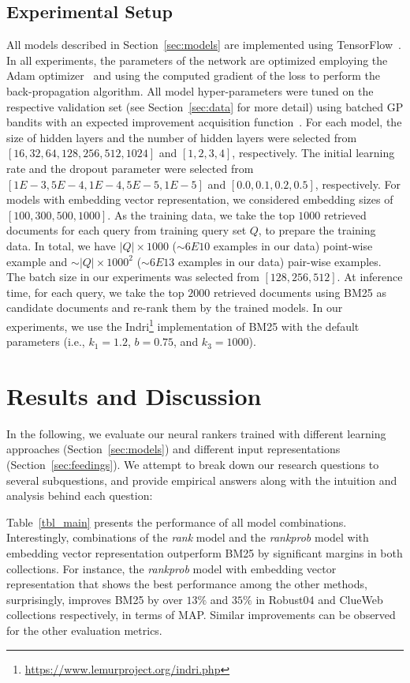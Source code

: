\documentclass[sigconf]{acmart}
\newcommand{\modeltwo}{\textit{rank} model\xspace}
\newcommand{\modelthree}{\textit{rank\-prob} model\xspace}
\newcommand{\feedthree}{embedding vector representation\xspace}
\newcommand{\shrink}{\vspace{-1.5ex}}
\begin{document}
\subsection{Experimental Setup}
All models described in Section~\ref{sec:models} are implemented using TensorFlow~\citep{tang2016:tflearn,tensorflow2015-whitepaper}.
In all experiments, the parameters of the network are optimized employing the Adam optimizer~\citep{Kingma:2014} and using the computed gradient of the loss to perform the back-propagation algorithm.
All model hyper-parameters were tuned on the respective validation set (see Section~\ref{sec:data} for more detail) using batched GP bandits with an expected improvement acquisition function~\citep{Desautels:2014}. 
For each model, the size of hidden layers and the number of hidden layers were selected from $[16, 32, 64, 128, 256, 512, 1024]$ and $[1, 2, 3, 4]$, respectively. The initial learning rate and the dropout parameter were selected from $[1E-3, 5E-4, 1E-4, 5E-5, 1E-5]$ and $[0.0, 0.1, 0.2, 0.5]$, respectively. For models with \feedthree, we considered embedding sizes of $[100, 300, 500, 1000]$. As the training data, we take the top $1000$ retrieved documents for each query from training query set $Q$, to prepare the training data. In total, we have $|Q|\times 1000$ ($\sim6E10$ examples in our data) point-wise example and $\sim|Q|\times 1000^2$ ($\sim6E13$ examples in our data) pair-wise examples. The batch size in our experiments was selected from  $[128, 256, 512]$.
At inference time, for each query, we take the top $2000$ retrieved documents using BM25 as candidate documents and re-rank them by the trained models. In our experiments, we use the Indri\footnote{\url{https://www.lemurproject.org/indri.php}} implementation of BM25 with the default parameters (i.e., $k_1 = 1.2$, $b = 0.75$, and $k_3 = 1000$).



\shrink
\section{Results and Discussion}
In the following, we evaluate our neural rankers trained with different learning approaches (Section~\ref{sec:models}) and different input representations (Section~\ref{sec:feedings}). We attempt to break down our research questions to several subquestions, and provide empirical answers along with the intuition and analysis behind each question:

Table~\ref{tbl_main} presents the performance of all model combinations.
Interestingly, combinations of the \modeltwo and the \modelthree with \feedthree outperform BM25 by significant margins in both collections. For instance, the \modelthree with \feedthree that shows the best performance among the other methods, surprisingly, improves BM25 by over $13\%$ and $35\%$ in Robust04 and ClueWeb collections respectively, in terms of MAP. Similar improvements can be observed for the other evaluation metrics.
\end{document}
